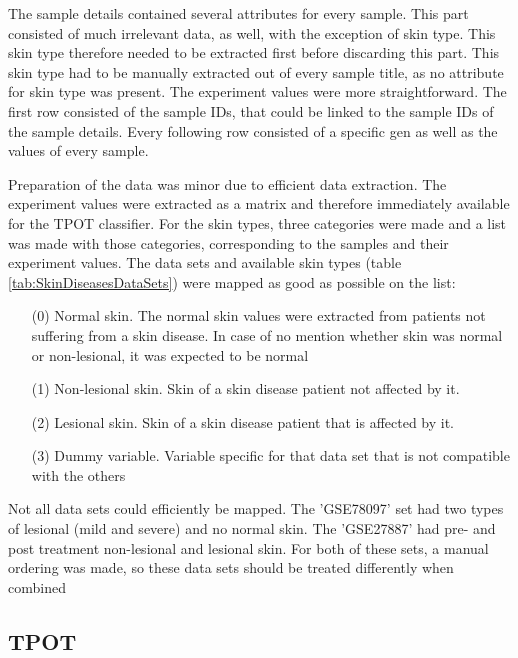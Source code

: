 \documentclass[10pt,a4paper]{article}
\begin{document}
	The sample details contained several attributes for every sample. This part consisted of much irrelevant data, as well, with the exception of skin type. This skin type therefore needed to be extracted first before discarding this part. This skin type had to be manually extracted out of every sample title, as no attribute for skin type was present. The experiment values were more straightforward. The first row consisted of the sample IDs, that could be linked to the sample IDs of the sample details. Every following row consisted of a specific gen as well as the values of every sample.
	
	Preparation of the data was minor due to efficient data extraction. The experiment values were extracted as a matrix and therefore immediately available for the TPOT classifier. For the skin types, three categories were made and a list was made with those categories, corresponding to the samples and their experiment values. The data sets and available skin types (table \ref{tab:SkinDiseasesDataSets}) were mapped as good as possible on the list: 
	
	\begin{enumerate}
		\item[(0)] Normal skin. The normal skin values were extracted from patients not suffering from a skin disease. In case of no mention whether skin was normal or non-lesional, it was expected to be normal
		\item[(1)] Non-lesional skin. Skin of a skin disease patient not affected by it.
		\item[(2)] Lesional skin. Skin of a skin disease patient that is affected by it.
		\item[(3)] Dummy variable. Variable specific for that data set that is not compatible with the others
	\end{enumerate}

	Not all data sets could efficiently be mapped. The 'GSE78097' set had two types of lesional (mild and severe) and no normal skin. The 'GSE27887' had pre- and post treatment non-lesional and lesional skin. For both of these sets, a manual ordering was made, so these data sets should be treated differently when combined
	
	
	\subsection{TPOT}
	\label{subsec:MethodsTPOT}
	
\end{document}
